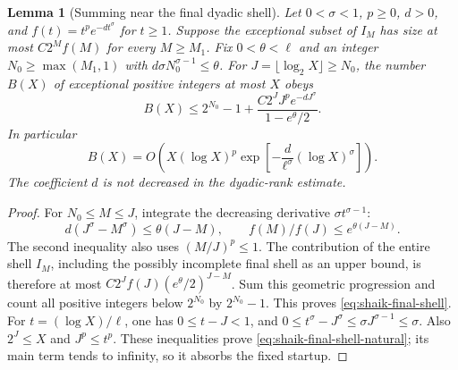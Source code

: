 \documentclass[11pt]{article}
\newtheorem{lemma}[proposition]{Lemma}
\theoremstyle{remark}\newtheorem{remark}[proposition]{Remark}
\begin{document}
\begin{lemma}[Summing near the final dyadic shell]
\label{lem:shaik-final-shell}
Let \(0<\sigma<1\), \(p\ge0\), \(d>0\), and
\(f(t)=t^p e^{-dt^\sigma}\) for \(t\ge1\).
Suppose the exceptional subset of \(I_M\) has size at most
\(C2^Mf(M)\) for every \(M\ge M_1\).
Fix \(0<\theta<\ell\) and an integer \(N_0\ge\max(M_1,1)\) with
\(d\sigma N_0^{\sigma-1}\le\theta\).
For \(J=\lfloor\log_2X\rfloor\ge N_0\), the number \(B(X)\) of
exceptional positive integers at most \(X\) obeys
\begin{equation}\label{eq:shaik-final-shell}
 B(X)\le2^{N_0}-1+
 \frac{C2^J J^p e^{-dJ^\sigma}}{1-e^\theta/2}.
\end{equation}
In particular
\begin{equation}\label{eq:shaik-final-shell-natural}
 B(X)=O\left(X(\log X)^p
       \exp\left[-\frac d{\ell^\sigma}(\log X)^\sigma\right]\right).
\end{equation}
The coefficient \(d\) is not decreased in the dyadic-rank estimate.
\end{lemma}
\begin{proof}
For \(N_0\le M\le J\), integrate the decreasing derivative
\(\sigma t^{\sigma-1}\):
\[
 d(J^\sigma-M^\sigma)\le\theta(J-M),\qquad
 f(M)/f(J)\le e^{\theta(J-M)}.
\]
The second inequality also uses \((M/J)^p\le1\).
The contribution of the entire shell \(I_M\), including the possibly
incomplete final shell as an upper bound, is therefore at most
\(C2^Jf(J)(e^\theta/2)^{J-M}\).
Sum this geometric progression and count all positive integers below
\(2^{N_0}\) by \(2^{N_0}-1\). This proves \eqref{eq:shaik-final-shell}.
For \(t=(\log X)/\ell\), one has \(0\le t-J<1\), and
\(0\le t^\sigma-J^\sigma\le\sigma J^{\sigma-1}\le\sigma\).
Also \(2^J\le X\) and \(J^p\le t^p\).
These inequalities prove \eqref{eq:shaik-final-shell-natural};
its main term tends to infinity, so it absorbs the fixed startup.
\end{proof}
\end{document}
